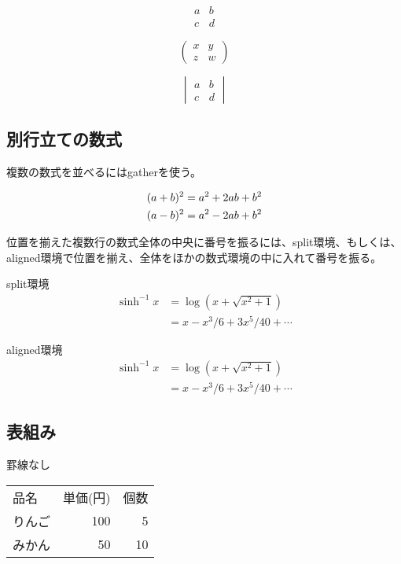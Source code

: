 \documentclass{article}
\begin{document}
\[
\begin{matrix}
  a & b \\ c & d
\end{matrix}
\]

\[
\begin{pmatrix}
  x & y \\ z & w
\end{pmatrix}
\]

\begin{equation}
  \begin{vmatrix}
    a & b \\ c & d
  \end{vmatrix}
\end{equation}

\subsection{別行立ての数式}
複数の数式を並べるにはgatherを使う。

\begin{gather}
  (a + b)^2 = a^2 + 2ab + b^2 \\
  (a - b)^2 = a^2 - 2ab + b^2 \notag \\
\end{gather}

位置を揃えた複数行の数式全体の中央に番号を振るには、split環境、もしくは、aligned環境で位置を揃え、全体をほかの数式環境の中に入れて番号を振る。

split環境
\begin{equation}
  \begin{split}
    \sinh^{-1} x &= \log(x + \sqrt{x^2 + 1}) \\
                 &= x - x^3\!/6 + 3x^5\!/40 + \dotsb
  \end{split}
\end{equation}

aligned環境
\begin{equation}
  \begin{aligned}
    \sinh^{-1} x &= \log(x + \sqrt{x^2 + 1}) \\
                 &= x - x^3\!/6 + 3x^5\!/40 + \dotsb
  \end{aligned}
\end{equation}

\subsection{表組み}

罫線なし
\begin{center}
  \begin{tabular}{lrr}
    品名 & 単価(円) & 個数 \\
    りんご & 100 & 5 \\
    みかん & 50 & 10
  \end{tabular}
\end{center}
\end{document}

